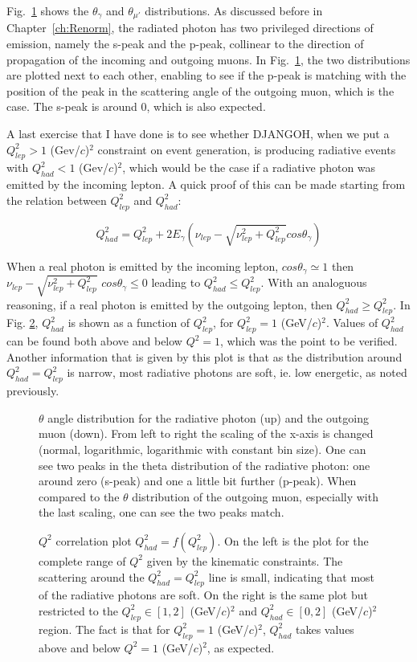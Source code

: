 Fig.~\ref{fig:anglesp} shows the $\theta_{\gamma}$ and $\theta_{\mu'}$
distributions. As discussed before in Chapter~\ref{ch:Renorm}, the radiated photon has two privileged directions of emission, namely the s-peak and the p-peak, collinear to the direction of propagation of the incoming and outgoing muons. In Fig.~\ref{fig:anglesp}, the two distributions are plotted next to each other, enabling to see if the p-peak is matching with the position of the peak in the scattering angle of the outgoing muon, which is the case. The s-peak is around $0$, which is also expected.

A last exercise that I have done is to see whether DJANGOH, when we put a $Q^2_{lep}>1$ (Gev/$c$)$^2$ constraint on event generation, is producing radiative events with $Q^2_{had}<1$ (Gev/$c$)$^2$, which would be the case if a radiative photon was emitted by the incoming lepton. A quick proof of this can be made starting from the relation between $Q^2_{lep}$ and $Q^2_{had}$:

\[Q^2_{had}=Q^2_{lep}+2E_\gamma(\nu_{lep}-\sqrt{\nu_{lep}^2+Q^2_{lep}}cos\theta_\gamma)\]

When a real photon is emitted by the incoming lepton, $cos\theta_\gamma \simeq 1$ then $\nu_{lep}-\sqrt{\nu_{lep}^2+Q^2_{lep}}$
$cos\theta_\gamma \leq 0$ leading to $Q^2_{had} \leq Q^2_{lep}$. With an analoguous reasoning, if a real photon is emitted by the outgoing lepton, then $Q^2_{had} \geq Q^2_{lep}$. In Fig. \ref{fig:Q2corr}, $Q^2_{had}$ is shown as a function of $Q^2_{lep}$, for $Q^2_{lep}=1$ (GeV/$c$)$^2$. Values of $Q^2_{had}$ can be found both above and below $Q^2=1$, which was the point to be verified. Another information that is given by this plot is that as the distribution around $Q^2_{had} = Q^2_{lep}$ is narrow, most radiative photons are soft, ie. low energetic, as noted previously.

\begin{figure}[htb]
\centerline{}
\caption{$\theta$ angle distribution for the radiative photon (up) and the outgoing muon (down). From left to right the scaling of the x-axis is changed (normal, logarithmic, logarithmic with constant bin size). One can see two peaks in the theta distribution of the radiative photon: one around zero (s-peak) and one a little bit further (p-peak). When compared to the $\theta$ distribution of the outgoing muon, especially with the last scaling, one can see the two peaks match.}\label{fig:anglesp}
 \end{figure}
\hfill
\begin{figure}[htb]
\centerline{}
\caption{$Q^2$ correlation plot $Q^2_{had}=f(Q^2_{lep})$. On the left is the plot for the complete range of $Q^2$
given by the kinematic constraints. The scattering around the $Q^2_{had} = Q^2_{lep}$ line is small, indicating that
most of the radiative photons are soft. On the right is the same plot but restricted to the $Q^2_{lep}\in[1,2]$ (GeV/$c$)$^2$ and
$Q^2_{had}\in[0,2]$ (GeV/$c$)$^2$ region. The fact is that for $Q^2_{lep}=1$ (GeV/$c$)$^2$, $Q^2_{had}$ takes values above and below $Q^2=1$ (GeV/$c$)$^2$, as expected.}\label{fig:Q2corr}
\end{figure}

